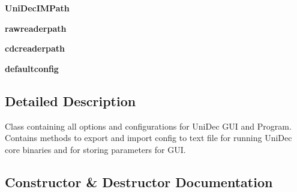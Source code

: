 \begin{DoxyCompactItemize}
\item 
\hypertarget{class_uni_dec_1_1unidec__modules_1_1unidecstructure_1_1_uni_dec_config_a6d5e4e70e0b2b711c9a492ffa635b9ec}{}{\bfseries Uni\+Dec\+I\+M\+Path}\label{class_uni_dec_1_1unidec__modules_1_1unidecstructure_1_1_uni_dec_config_a6d5e4e70e0b2b711c9a492ffa635b9ec}

\item 
\hypertarget{class_uni_dec_1_1unidec__modules_1_1unidecstructure_1_1_uni_dec_config_ab7db92b19ebf3f2c6874f519618821b1}{}{\bfseries rawreaderpath}\label{class_uni_dec_1_1unidec__modules_1_1unidecstructure_1_1_uni_dec_config_ab7db92b19ebf3f2c6874f519618821b1}

\item 
\hypertarget{class_uni_dec_1_1unidec__modules_1_1unidecstructure_1_1_uni_dec_config_a3546f9b7ff50db4239e1b7edf8fc9d9f}{}{\bfseries cdcreaderpath}\label{class_uni_dec_1_1unidec__modules_1_1unidecstructure_1_1_uni_dec_config_a3546f9b7ff50db4239e1b7edf8fc9d9f}

\item 
\hypertarget{class_uni_dec_1_1unidec__modules_1_1unidecstructure_1_1_uni_dec_config_a3af3eff44e9c2864d38523460d11ff0e}{}{\bfseries defaultconfig}\label{class_uni_dec_1_1unidec__modules_1_1unidecstructure_1_1_uni_dec_config_a3af3eff44e9c2864d38523460d11ff0e}

\end{DoxyCompactItemize}


\subsection{Detailed Description}
\begin{DoxyVerb}Class containing all options and configurations for UniDec GUI and Program. Contains methods to export and import
config to text file for running UniDec core binaries and for storing parameters for GUI.
\end{DoxyVerb}
 

\subsection{Constructor \& Destructor Documentation}
\hypertarget{class_uni_dec_1_1unidec__modules_1_1unidecstructure_1_1_uni_dec_config_a2faabae99205ce431c514f8a91d56137}{}
